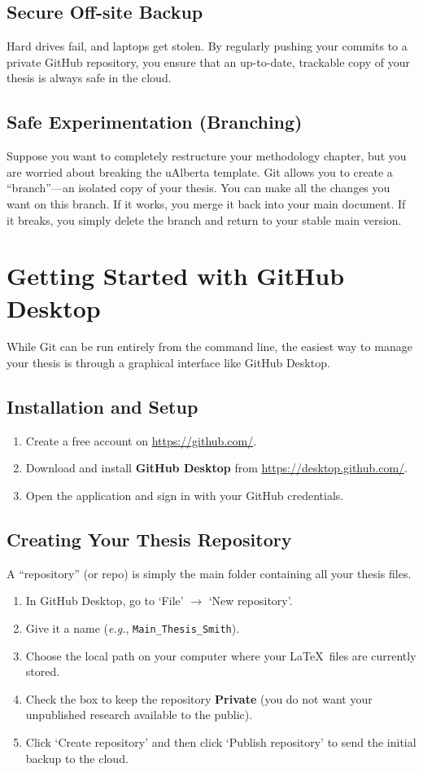		\subsection{Secure Off-site Backup}
			Hard drives fail, and laptops get stolen. 
			By regularly pushing your commits to a private GitHub repository, you ensure that an up-to-date, trackable copy of your thesis is always safe in the cloud.

		\subsection{Safe Experimentation (Branching)}
			Suppose you want to completely restructure your methodology chapter, but you are worried about breaking the uAlberta template. 
			Git allows you to create a ``branch''—an isolated copy of your thesis. 
			You can make all the changes you want on this branch. 
			If it works, you merge it back into your main document. 
			If it breaks, you simply delete the branch and return to your stable main version.

	\section{Getting Started with GitHub Desktop}
		While Git can be run entirely from the command line, the easiest way to manage your thesis is through a graphical interface like GitHub Desktop.

		\subsection{Installation and Setup}
			\begin{enumerate}
				\item Create a free account on \url{https://github.com/}.
				\item Download and install \textbf{GitHub Desktop} from \url{https://desktop.github.com/}.
				\item Open the application and sign in with your GitHub credentials.
			\end{enumerate}

		\subsection{Creating Your Thesis Repository}
			A ``repository'' (or repo) is simply the main folder containing all your thesis files.
			\begin{enumerate}
				\item In GitHub Desktop, go to `File' $\rightarrow$ `New repository'.
				\item Give it a name (\textit{e.g.}, \texttt{Main\_Thesis\_Smith}).
				\item Choose the local path on your computer where your \LaTeX\ files are currently stored.
				\item Check the box to keep the repository \textbf{Private} (you do not want your unpublished research available to the public).
				\item Click `Create repository' and then click `Publish repository' to send the initial backup to the cloud.
			\end{enumerate}

